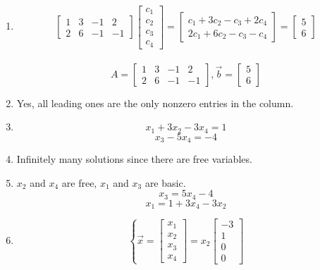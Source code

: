 \begin{SaveQuestion}
    \begin{enumerate}
        \item$$ \begin{bmatrix}
            1 & 3 & -1 & 2 \\
            2 & 6 & -1 & -1
        \end{bmatrix}
        \begin{bmatrix}
            c_1 \\ c_2 \\ c_3 \\ c_4
        \end{bmatrix}
        =
        \begin{bmatrix}
            c_1 + 3c_2 - c_3 + 2c_4 \\
            2c_1 + 6c_2 - c_3 - c_4
        \end{bmatrix}
        = 
        \begin{bmatrix}
            5 \\ 6
        \end{bmatrix} $$\\ 
        $$ A = \begin{bmatrix}
            1 & 3 & -1 & 2 \\
            2 & 6 & -1 & -1
        \end{bmatrix}, \vec b = \begin{bmatrix}
            5 \\ 6
        \end{bmatrix}$$
        \item Yes, all leading ones are the only nonzero entries in the column.
        \item $$ x_1 + 3x_2 - 3x_4 = 1$$  $$x_3 - 5x_4 = -4$$
        \item Infinitely many solutions since there are free variables.
        \item $x_2$ and $x_4$ are free, $x_1$ and $x_3$ are basic. 
        $$x_3 = 5x_4 - 4$$  $$x_1 = 1 + 3x_4 - 3x_2$$
        \item $$\left\{ \vec x = \begin{bmatrix}
            x_1 \\ x_2 \\ x_3 \\ x_4
        \end{bmatrix} = x_2 \begin{bmatrix}
            -3 \\ 1 \\ 0 \\ 0

\end{bmatrix}$$
\end{enumerate}
\end{SaveQuestion}
